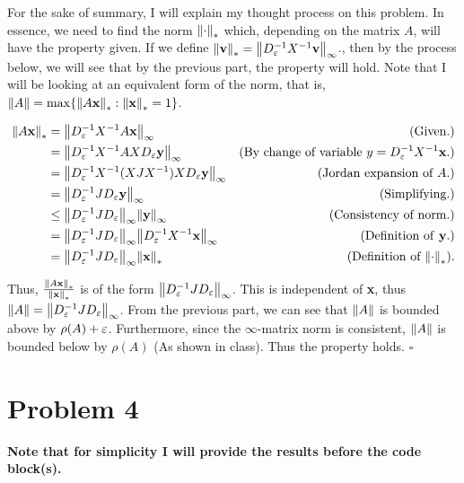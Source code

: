 \begin{solution}

    For the sake of summary, I will explain my thought process on this problem. In essence, we need to find the norm $\norm{\cdot}_*$ which, depending on the matrix $A$, will have the property given. If we define $\norm{\textbf{v}}_* = \norm{D_\varepsilon^{-1}X^{-1}\textbf{v}}_\infty$., then by the process below, we will see that by the previous part, the property will hold. Note that I will be looking at an equivalent form of the norm, that is, $\norm{A} = \max \{\norm{A\textbf{x}}_* : \norm{\textbf{x}}_* = 1\}$.

    \alignbreak
    \begin{align}
    \norm{A\textbf{x}}_* &= \norm{D_\varepsilon^{-1}X^{-1}A\textbf{x}}_\infty &\text{(Given.)}\nonumber\\
    &= \norm{D_\varepsilon^{-1}X^{-1}AXD_\varepsilon \textbf{y}}_\infty &\text{(By change of variable $y = D_\varepsilon^{-1}X^{-1}\textbf{x}$.)}\nonumber\\
    &= \norm{D_\varepsilon^{-1}X^{-1}(XJX^{-1})XD_\varepsilon \textbf{y}}_\infty &\text{(Jordan expansion of $A$.)}\nonumber\\
    &= \norm{D_\varepsilon^{-1}JD_{\varepsilon}\textbf{y}}_\infty &\text{(Simplifying.)}\nonumber\\
    &\leq \norm{D_\varepsilon^{-1}JD_\varepsilon}_\infty \norm{\textbf{y}}_\infty &\text{(Consistency of norm.)}\nonumber\\
    &= \norm{D_\varepsilon^{-1}JD_{\varepsilon}}_\infty \norm{D_\varepsilon^{-1}X^{-1}\textbf{x}}_\infty &\text{(Definition of \textbf{y}.)}\nonumber\\
    &= \norm{D_\varepsilon^{-1}JD_{\varepsilon}}_\infty \norm{\textbf{x}}_* &\text{(Definition of $\norm{\cdot}_*$).}\nonumber
    \end{align}
    \alignbreak

    Thus, $\frac{\norm{A\textbf{x}}_*}{\norm{\textbf{x}}_*}$ is of the form $\norm{D_\varepsilon^{-1}JD_{\varepsilon}}_\infty$. This is independent of \textbf{x}, thus $\norm{A} = \norm{D_\varepsilon^{-1}JD_{\varepsilon}}_\infty$. From the previous part, we can see that $\norm{A}$ is bounded above by $\rho(A) + \varepsilon$. Furthermore, since the $\infty$-matrix norm is consistent, $\norm{A}$ is bounded below by $\rho(A)$ (As shown in class). Thus the property holds. $\square$  
\end{solution}
\newpage
\section{Problem 4}
\textbf{Note that for simplicity I will provide the results before the code block(s).}


